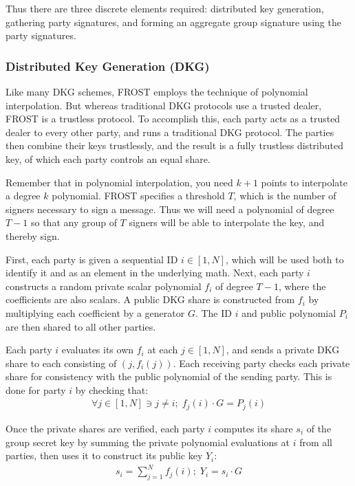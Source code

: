 \documentclass{article}
\begin{document}
Thus there are three discrete elements required: distributed key generation, gathering party signatures, and forming an aggregate group signature using the party signatures.

\subsubsection{
  Distributed Key Generation (DKG)
}

Like many DKG schemes, FROST employs the technique of polynomial interpolation.  But whereas traditional DKG protocols use a trusted dealer, FROST is a trustless protocol.  To accomplish this, each party acts as a trusted dealer to every other party, and runs a traditional DKG protocol.  The parties then combine their keys trustlessly, and the result is a fully trustless distributed key, of which each party controls an equal share.

Remember that in polynomial interpolation, you need $k+1$ points to interpolate a degree $k$ polynomial.  FROST specifies a threshold $T$, which is the number of signers necessary to sign a message.  Thus we will need a polynomial of degree $T-1$ so that any group of $T$ signers will be able to interpolate the key, and thereby sign.

First, each party is given a sequential ID $i \in [1, N]$, which will be used both to identify it and as an element in the underlying math.  Next, each party $i$ constructs a random private scalar polynomial $f_i$ of degree $T-1$, where the coefficients are also scalars.  A public DKG share is constructed from $f_i$ by multiplying each coefficient by a generator $G$.  The ID $i$ and public polynomial $P_i$ are then shared to all other parties.

Each party $i$ evaluates its own $f_i$ at each $j \in [1,N]$, and sends a private DKG share to each consisting of $(j, f_i(j))$.  Each receiving party checks each private share for consistency with the public polynomial of the sending party.  This is done for party $i$ by checking that:
\begin{align}
  \forall j \in [1,N] \ni j \neq i;\;f_j(i) \cdot G = P_j(i)
\end{align}

Once the private shares are verified, each party $i$ computes its share $s_i$ of the group secret key by summing the private polynomial evaluations at $i$ from all parties, then uses it to construct its public key $Y_i$:
\begin{align}
  s_i = \sum_{j=1}^{N} f_j(i) ;\; Y_i = s_i \cdot G
\end{align}
\end{document}
